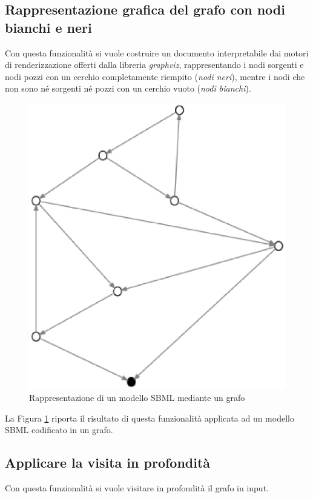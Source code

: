 \subsection{Rappresentazione grafica del grafo con nodi bianchi e
  neri}
\label{subsection:represent-it-in-black-and-white}
Con questa funzionalit\`a si vuole costruire un documento
interpretabile dai motori di renderizzazione offerti dalla libreria
\emph{graphviz}, rappresentando i nodi sorgenti e nodi pozzi con un
cerchio completamente riempito (\emph{nodi neri}), mentre i nodi che
non sono n\'e sorgenti n\'e pozzi con un cerchio vuoto (\emph{nodi
  bianchi}).
\begin{figure}
  \centering
  \includegraphics[scale=0.8]{images/applicationOfPrinterPipeFilterOnTarjanModel-phase-PrinterPipeFilter-level-0.eps}
  \caption{Rappresentazione di un modello SBML mediante un grafo}
  \label{fig:simple-black-and-white}
\end{figure}

La Figura \ref{fig:simple-black-and-white} riporta il risultato di
questa funzionalit\`a applicata ad un modello SBML codificato in un
grafo.

\subsection{Applicare la visita in profondit\`a}
Con questa funzionalit\`a si vuole visitare in profondit\`a il grafo
in input.


